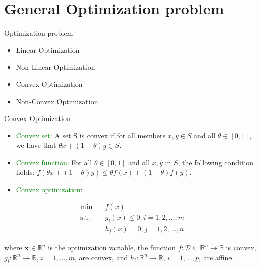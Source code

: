 \section{General Optimization problem}

    \frame{\sectionpage}

    \begin{frame}{Optimization problem}
      \begin{itemize}
        \item Linear Optimization
        \item Non-Linear Optimization
      \end{itemize}

      \vspace{18pt}

      \begin{itemize}
        \item Convex Optimization
        \item Non-Convex Optimization
      \end{itemize}
    \end{frame}

    \begin{frame}{Convex Optimization}
      \begin{itemize}
        \item \textcolor{green}{Convex set}:
        A set S is convex if for all members $ x,y\in S $ and all $ \theta \in [0,1] $, we have that $ \theta x+(1-\theta )y\in S $.
        \item \textcolor{green}{Convex function}:
        For all $\theta \in [0,1] $ and all $ x,y $ in $S$, the following condition holds: $f(\theta x+(1-\theta )y)\leq \theta f(x)+(1-\theta )f(y) $.

        \item \textcolor{green}{Convex optimization}:
      \end{itemize}
      \begin{equation*}
        \begin{align}
        \min &\quad f(x) \\
        \text{s.t.} &\quad g_i(x) \leq 0, i=1,2,...,m \\
          &\quad h_j(x) = 0, j = 1,2,...,n
        \end{align}
      \end{equation*}

      \quad where $ \mathbf {x} \in \mathbb {R} ^{n} $ is the optimization variable, the function $ f:{\mathcal {D}}\subseteq \mathbb {R} ^{n}\to \mathbb {R} $ is convex, $ g_{i}:\mathbb {R} ^{n}\to \mathbb {R} $, $ i=1,\ldots ,m $, are convex, and $ h_{i}:\mathbb {R} ^{n}\to \mathbb {R} $, $ i=1,\ldots ,p $, are affine.
    \end{frame}

